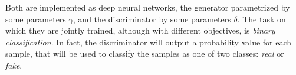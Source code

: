 Both are implemented as deep neural networks, the generator parametrized by some parameters $\gamma$, and the discriminator by some parameters $\delta$. The task on which they are jointly trained, although with different objectives, is \emph{binary classification}. In fact, the discriminator will output a probability value for each sample, that will be used to classify the samples as one of two classes: \emph{real} or \emph{fake}.